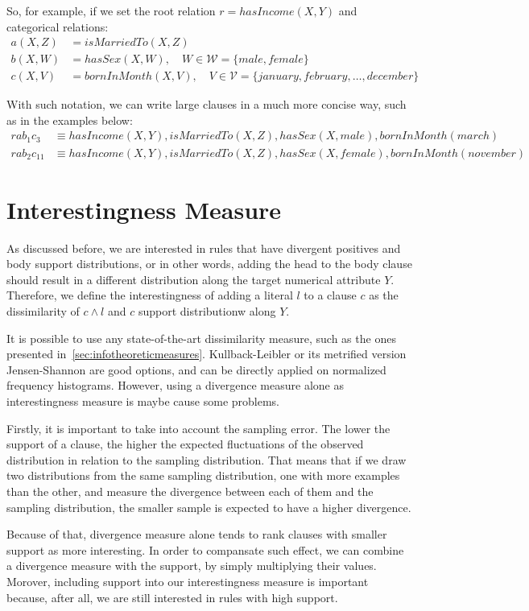 So, for example, if we set the root relation $r=hasIncome(X,Y)$ and categorical relations:
\begin{align*}
a(X,Z)&=isMarriedTo(X,Z) \\
b(X,W)&=hasSex(X,W), \quad W \in \mathcal{W} =\{male,female\} \\
c(X,V)&=bornInMonth(X,V), \quad V \in \mathcal{V} =\{january,february,\ldots,december\}
\end{align*}

With such notation, we can write large clauses in a much more concise way, such as in the examples below:
\begin{align*}
rab_1c_3 &\equiv hasIncome(X,Y),isMarriedTo(X,Z),hasSex(X,male),bornInMonth(march) \\
rab_2c_{11} &\equiv hasIncome(X,Y),isMarriedTo(X,Z),hasSex(X,female),bornInMonth(november)
\end{align*}

\section{Interestingness Measure}

As discussed before, we are interested in rules that have divergent positives and body support distributions, or in
other words, adding the head to the body clause should result in a different distribution along the target numerical
attribute $Y$. Therefore, we define the interestingness of adding a literal $l$ to a clause $c$ as the
dissimilarity of $c \wedge l$ and $c$ support distributionw along $Y$.

It is possible to use any state-of-the-art dissimilarity measure, such as the ones presented
in~\ref{sec:infotheoreticmeasures}. Kullback-Leibler or its metrified version Jensen-Shannon are good options, and
can be directly applied on normalized frequency histograms. However, using a divergence
measure alone as interestingness measure is maybe cause some problems.

Firstly, it is important to take into account the sampling error. The lower the support of a clause, the higher the
expected fluctuations of the observed distribution in relation to the sampling distribution. That means that if we
draw two distributions from the same sampling distribution, one with more examples than the other, and measure the
divergence between each of them and the sampling distribution, the smaller sample is expected to have a higher
divergence.

Because of that, divergence measure alone tends to rank clauses with smaller support as more interesting. In order to
compansate such effect, we can combine a divergence measure with the support, by simply multiplying their values.
Morover, including support into our interestingness measure is important because, after all, we are still interested
in rules with high support.

